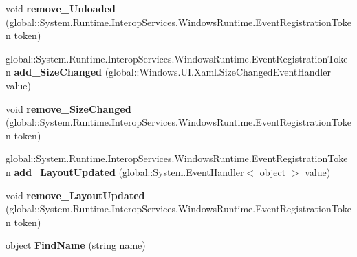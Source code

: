 \begin{DoxyCompactItemize}
\item 
\mbox{\label{interface_windows_1_1_u_i_1_1_xaml_1_1_i_framework_element_a3289e30bb0249071801645260d266744}} 
void {\bfseries remove\+\_\+\+Unloaded} (global\+::\+System.\+Runtime.\+Interop\+Services.\+Windows\+Runtime.\+Event\+Registration\+Token token)
\item 
\mbox{\label{interface_windows_1_1_u_i_1_1_xaml_1_1_i_framework_element_abf3ac37a9daffc43b7299c8aa7b02e4a}} 
global\+::\+System.\+Runtime.\+Interop\+Services.\+Windows\+Runtime.\+Event\+Registration\+Token {\bfseries add\+\_\+\+Size\+Changed} (global\+::\+Windows.\+U\+I.\+Xaml.\+Size\+Changed\+Event\+Handler value)
\item 
\mbox{\label{interface_windows_1_1_u_i_1_1_xaml_1_1_i_framework_element_aee2c3dbe7e3702a98c8bff9f0c4720c0}} 
void {\bfseries remove\+\_\+\+Size\+Changed} (global\+::\+System.\+Runtime.\+Interop\+Services.\+Windows\+Runtime.\+Event\+Registration\+Token token)
\item 
\mbox{\label{interface_windows_1_1_u_i_1_1_xaml_1_1_i_framework_element_a25ade46d3420c73f6b9ca99a333bf905}} 
global\+::\+System.\+Runtime.\+Interop\+Services.\+Windows\+Runtime.\+Event\+Registration\+Token {\bfseries add\+\_\+\+Layout\+Updated} (global\+::\+System.\+Event\+Handler$<$ object $>$ value)
\item 
\mbox{\label{interface_windows_1_1_u_i_1_1_xaml_1_1_i_framework_element_ac054df7c36430442d26d3ce119295117}} 
void {\bfseries remove\+\_\+\+Layout\+Updated} (global\+::\+System.\+Runtime.\+Interop\+Services.\+Windows\+Runtime.\+Event\+Registration\+Token token)
\item 
\mbox{\label{interface_windows_1_1_u_i_1_1_xaml_1_1_i_framework_element_a07a0149f2dee5784c52807f935eb41d9}} 
object {\bfseries Find\+Name} (string name)
\item 
\mbox{\label{interface_windows_1_1_u_i_1_1_xaml_1_1_i_framework_element_aa9da62c1e38c8633cffa0cbd01a78dc6}} 

\end{DoxyCompactItemize}
